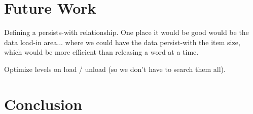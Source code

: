 \section{Future Work}



Defining a persists-with relationship.
One place it would be good would be the data load-in area... where we could have
the data persist-with the item size, which would be more efficient than
releasing a word at a time.


Optimize levels on load / unload (so we don't have to search them all).

\section{Conclusion}

